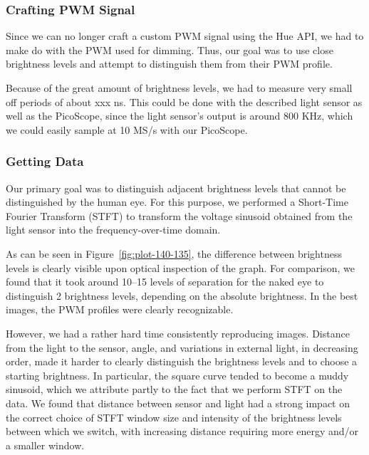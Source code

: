 \subsubsection{Crafting PWM Signal}

Since we can no longer craft a custom PWM signal using the Hue API, we had to make do with the PWM used for dimming.
Thus, our goal was to use close brightness levels and attempt to distinguish them from their PWM profile.

Because of the great amount of brightness levels, we had to measure very small off periods of about xxx ns. This could be done with the described light sensor as well as the PicoScope, since the light sensor's output is around 800 KHz, which we could easily sample at 10 MS/s with our PicoScope.

\subsubsection{Getting Data}
Our primary goal was to distinguish adjacent brightness levels that cannot be distinguished by the human eye.
For this purpose, we performed a Short-Time Fourier Transform (STFT) to transform the voltage sinusoid obtained from the light sensor into the frequency-over-time domain.

As can be seen in Figure~\ref{fig:plot-140-135}, the difference between brightness levels is clearly visible upon optical inspection of the graph.
For comparison, we found that it took around 10--15 levels of separation for the naked eye to distinguish 2 brightness levels, depending on the absolute brightness.
In the best images, the PWM profiles were clearly recognizable.

However, we had a rather hard time consistently reproducing images.
Distance from the light to the sensor, angle, and variations in external light, in decreasing order, made it harder to clearly distinguish the brightness levels and to choose a starting brightness.
In particular, the square curve tended to become a muddy sinusoid, which we attribute partly to the fact that we perform STFT on the data.
We found that distance between sensor and light had a strong impact on the correct choice of STFT window size and intensity of the brightness levels between which we switch, with increasing distance requiring more energy and/or a smaller window.

